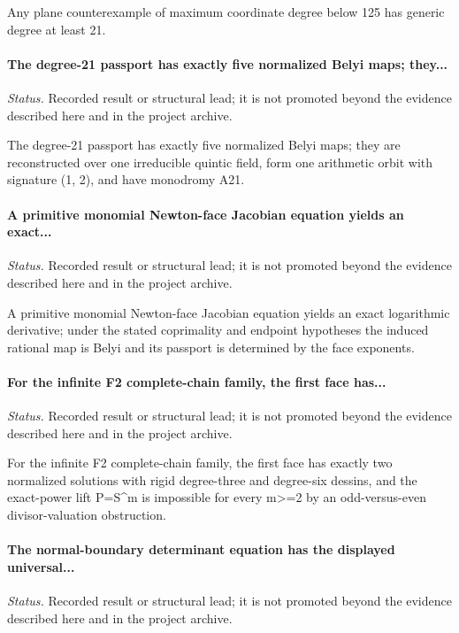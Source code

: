 Any plane counterexample of maximum coordinate degree below 125 has generic degree at least 21.

\label{supp-note-06-027}
\paragraph{The degree-21 passport has exactly five normalized Belyi maps; they...}
\emph{Status.} Recorded result or structural lead; it is not promoted beyond the evidence described here and in the project archive.

The degree-21 passport has exactly five normalized Belyi maps; they are reconstructed over one irreducible quintic field, form one arithmetic orbit with signature (1, 2), and have monodromy A21.

\label{supp-note-06-028}
\paragraph{A primitive monomial Newton-face Jacobian equation yields an exact...}
\emph{Status.} Recorded result or structural lead; it is not promoted beyond the evidence described here and in the project archive.

A primitive monomial Newton-face Jacobian equation yields an exact logarithmic derivative; under the stated coprimality and endpoint hypotheses the induced rational map is Belyi and its passport is determined by the face exponents.

\label{supp-note-06-029}
\paragraph{For the infinite F2 complete-chain family, the first face has...}
\emph{Status.} Recorded result or structural lead; it is not promoted beyond the evidence described here and in the project archive.

For the infinite F2 complete-chain family, the first face has exactly two normalized solutions with rigid degree-three and degree-six dessins, and the exact-power lift P=S\textasciicircum{}m is impossible for every m>=2 by an odd-versus-even divisor-valuation obstruction.

\label{supp-note-06-030}
\paragraph{The normal-boundary determinant equation has the displayed universal...}
\emph{Status.} Recorded result or structural lead; it is not promoted beyond the evidence described here and in the project archive.

